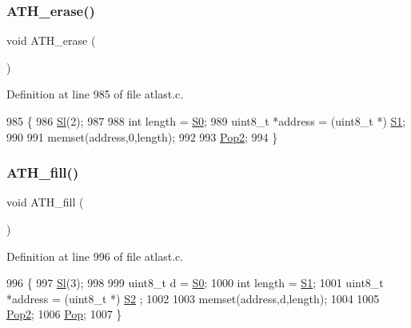 \subsubsection{\texorpdfstring{A\+T\+H\+\_\+erase()}{ATH\_erase()}}
{\footnotesize\ttfamily void A\+T\+H\+\_\+erase (\begin{DoxyParamCaption}{ }\end{DoxyParamCaption})}



Definition at line 985 of file atlast.\+c.


\begin{DoxyCode}
985                  \{
986     \hyperlink{atldef_8h_a5926d5feea48dfae9eef1fb4e2bdb5fa}{Sl}(2);
987 
988     \textcolor{keywordtype}{int} length = \hyperlink{atldef_8h_a5cfab9793f7fd3ac4ab45eff41df9f37}{S0};
989     uint8\_t *address = (uint8\_t *) \hyperlink{atldef_8h_a690d30e9ad3647835c243368b36d4c41}{S1};
990 
991     memset(address,0,length);
992 
993     \hyperlink{atldef_8h_aa25c480f1a1ad10fdb756d8fd02a98ea}{Pop2};
994 \}
\end{DoxyCode}
\mbox{\label{group__Standard__forth_ga67975f3222fec3ffefd7ba74669464bb}} 
\subsubsection{\texorpdfstring{A\+T\+H\+\_\+fill()}{ATH\_fill()}}
{\footnotesize\ttfamily void A\+T\+H\+\_\+fill (\begin{DoxyParamCaption}{ }\end{DoxyParamCaption})}



Definition at line 996 of file atlast.\+c.


\begin{DoxyCode}
996                 \{
997     \hyperlink{atldef_8h_a5926d5feea48dfae9eef1fb4e2bdb5fa}{Sl}(3);
998 
999     uint8\_t d = \hyperlink{atldef_8h_a5cfab9793f7fd3ac4ab45eff41df9f37}{S0};
1000     \textcolor{keywordtype}{int} length = \hyperlink{atldef_8h_a690d30e9ad3647835c243368b36d4c41}{S1};
1001     uint8\_t *address = (uint8\_t *) \hyperlink{atldef_8h_ad5e70dee3c36d645b0eb1743b8a7d2bf}{S2} ;
1002 
1003     memset(address,d,length);
1004 
1005     \hyperlink{atldef_8h_aa25c480f1a1ad10fdb756d8fd02a98ea}{Pop2};
1006     \hyperlink{atldef_8h_ad590ef6976fe2df5123108916638a353}{Pop};
1007 \}
\end{DoxyCode}
